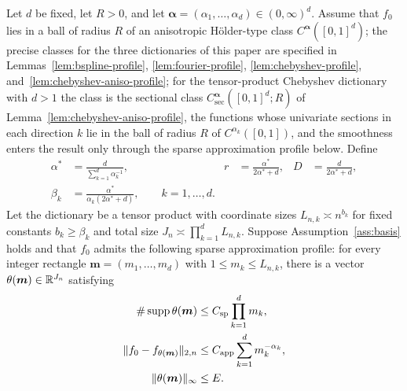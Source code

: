\begin{corollary}{\thecorollary}\label{cor:anisotropic}
Let $d$ be fixed, let $R>0$, and let
$\boldsymbol\alpha=(\alpha_1,\ldots,\alpha_d)\in(0,\infty)^d$.
Assume that $f_0$ lies in a ball of radius $R$ of an anisotropic H\"older-type class $C^{\boldsymbol\alpha}([0,1]^d)$; the precise classes for the three dictionaries of this paper are specified in Lemmas~\ref{lem:bspline-profile}, \ref{lem:fourier-profile}, \ref{lem:chebyshev-profile}, and~\ref{lem:chebyshev-aniso-profile}; for the tensor-product Chebyshev dictionary with $d>1$ the class is the sectional class $C^{\boldsymbol\alpha}_{\mathrm{sec}}([0,1]^d;R)$ of Lemma~\ref{lem:chebyshev-aniso-profile}, the functions whose univariate sections in each direction $k$ lie in the ball of radius $R$ of $C^{\alpha_k}([0,1])$, and the smoothness enters the result only through the sparse approximation profile below. Define
\begin{align}
\alpha^*
&=\frac{d}{\sum_{k=1}^d\alpha_k^{-1}},
&
r
&=\frac{\alpha^*}{2\alpha^*+d},
&
D
&=\frac{d}{2\alpha^*+d}, \label{eq:aniso-exponents}\\
\beta_k
&=\frac{\alpha^*}{\alpha_k(2\alpha^*+d)},
\qquad k=1,\ldots,d. \label{eq:aniso-beta}
\end{align}
Let the dictionary be a tensor product with coordinate sizes $L_{n,k}\asymp n^{b_k}$ for fixed constants $b_k\geq\beta_k$ and total size $J_n\asymp\prod_{k=1}^dL_{n,k}$. Suppose Assumption~\ref{ass:basis} holds and that $f_0$ admits the following sparse approximation profile: for every integer rectangle $\boldsymbol m=(m_1,\ldots,m_d)$ with $1\leq m_k\leq L_{n,k}$, there is a vector $\theta(\boldsymbol m)\in\mathbb{R}^{J_n}$ satisfying
\begin{align}
\#\operatorname{supp}\theta(\boldsymbol m)
&\leq C_{\mathrm{sp}}\prod_{k=1}^dm_k,\notag\\
\|f_0-f_{\theta(\boldsymbol m)}\|_{2,n}
&\leq C_{\mathrm{app}}\sum_{k=1}^dm_k^{-\alpha_k}, \label{eq:aniso-profile}\\
\|\theta(\boldsymbol m)\|_\infty
&\leq E.\notag
\end{align}

\end{corollary}
